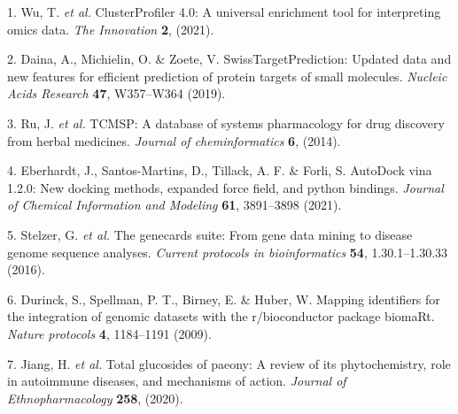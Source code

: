 \documentclass[
]{article}
\newenvironment{cslreferences}%
  {}%
  {\par}
\begin{document}
\hypertarget{refs}{}
\begin{cslreferences}
\leavevmode\hypertarget{ref-ClusterprofilerWuTi2021}{}%
1. Wu, T. \emph{et al.} ClusterProfiler 4.0: A universal enrichment tool for interpreting omics data. \emph{The Innovation} \textbf{2}, (2021).

\leavevmode\hypertarget{ref-SwisstargetpredDaina2019}{}%
2. Daina, A., Michielin, O. \& Zoete, V. SwissTargetPrediction: Updated data and new features for efficient prediction of protein targets of small molecules. \emph{Nucleic Acids Research} \textbf{47}, W357--W364 (2019).

\leavevmode\hypertarget{ref-TcmspADatabaRuJi2014}{}%
3. Ru, J. \emph{et al.} TCMSP: A database of systems pharmacology for drug discovery from herbal medicines. \emph{Journal of cheminformatics} \textbf{6}, (2014).

\leavevmode\hypertarget{ref-AutodockVina1Eberha2021}{}%
4. Eberhardt, J., Santos-Martins, D., Tillack, A. F. \& Forli, S. AutoDock vina 1.2.0: New docking methods, expanded force field, and python bindings. \emph{Journal of Chemical Information and Modeling} \textbf{61}, 3891--3898 (2021).

\leavevmode\hypertarget{ref-TheGenecardsSStelze2016}{}%
5. Stelzer, G. \emph{et al.} The genecards suite: From gene data mining to disease genome sequence analyses. \emph{Current protocols in bioinformatics} \textbf{54}, 1.30.1--1.30.33 (2016).

\leavevmode\hypertarget{ref-MappingIdentifDurinc2009}{}%
6. Durinck, S., Spellman, P. T., Birney, E. \& Huber, W. Mapping identifiers for the integration of genomic datasets with the r/bioconductor package biomaRt. \emph{Nature protocols} \textbf{4}, 1184--1191 (2009).

\leavevmode\hypertarget{ref-TotalGlucosideJiang2020}{}%
7. Jiang, H. \emph{et al.} Total glucosides of paeony: A review of its phytochemistry, role in autoimmune diseases, and mechanisms of action. \emph{Journal of Ethnopharmacology} \textbf{258}, (2020).
\end{cslreferences}
\end{document}
